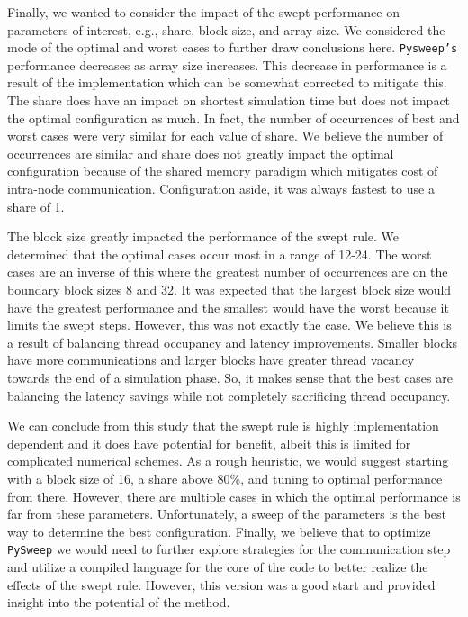 \documentclass[preprints,article,accept,moreauthors,pdftex]{Definitions/mdpi}
\def\pysweep{\texttt{PySweep}}
\begin{document}
Finally, we wanted to consider the impact of the swept performance on parameters of interest, e.g., share, block size, and array size. We considered the mode of the optimal and worst cases to further draw conclusions here. \texttt{Pysweep's} performance decreases as array size increases. This decrease in performance is a result of the implementation which can be somewhat corrected to mitigate this. The share does have an impact on shortest simulation time but does not impact the optimal configuration as much. In fact, the number of occurrences of best and worst cases were very similar for each value of share. We believe the number of occurrences are similar and share does not greatly impact the optimal configuration because of the shared memory paradigm which mitigates cost of intra-node communication. 
Configuration aside, it was always fastest to use a share of 1.

The block size greatly impacted the performance of the swept rule. We determined that the optimal cases occur most in a range of 12-24. The worst cases are an inverse of this where the greatest number of occurrences are on the boundary block sizes 8 and 32. It was expected that the largest block size would have the greatest performance and the smallest would have the worst because it limits the swept steps. However, this was not exactly the case. We believe this is a result of balancing thread occupancy and latency improvements. Smaller blocks have more communications and larger blocks have greater thread vacancy towards the end of a simulation phase. So, it makes sense that the best cases are balancing the latency savings while not completely sacrificing thread occupancy. 

We can conclude from this study that the swept rule is highly implementation dependent and it does have potential for benefit, albeit this is limited for complicated numerical schemes. As a rough heuristic, we would suggest starting with a block size of 16, a share above 80\%, and tuning to optimal performance from there. However, there are multiple cases in which the optimal performance is far from these parameters. Unfortunately, a sweep of the parameters is the best way to determine the best configuration. Finally, we believe that to optimize \pysweep{} we would need to further explore strategies for the communication step and utilize a compiled language for the core of the code to better realize the effects of the swept rule. However, this version was a good start and provided insight into the potential of the method. 
\end{document}
